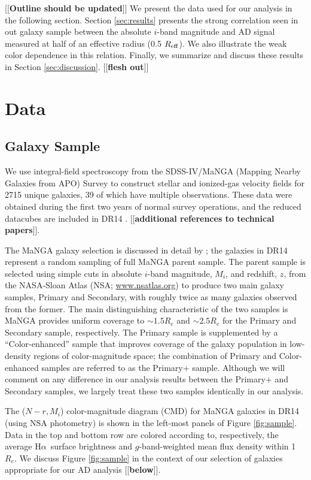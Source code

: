 \documentclass[apj,iop,revtex4,numberedappendix]{emulateapj}
\newcommand{\comment}[2][todo]{{\color{#1}[[{\bf #2}]]}}
\newcommand{\halpha}{H$\alpha$}
\begin{document}
\comment{Outline should be updated} We present the data used for our
analysis in the following section.  Section \ref{sec:results} presents
the strong correlation seen in out galaxy sample between the absolute
$i$-band magnitude and AD signal measured at half of an effective radius
(0.5 $R_{\rm eff}$).  We also illustrate the weak color dependence in
this relation.  Finally, we summarize and discuss these results in
Section \ref{sec:discussion}.  \comment{flesh out}

\section{Data}
\label{sec:data}

\subsection{Galaxy Sample}

We use integral-field spectroscopy from the SDSS-IV/MaNGA (Mapping
Nearby Galaxies from APO) Survey to construct stellar and ionized-gas
velocity fields for 2715 unique galaxies, 39 of which have multiple
observations.  These data were obtained during the first two years of
normal survey operations, and the reduced datacubes are included in DR14
\citep{2017arXiv170709322A}.  \comment{additional references to
technical papers}.

The MaNGA galaxy selection is discussed in detail by
\citet{2017AJ....154...86W}; the galaxies in DR14 represent a random
sampling of full MaNGA parent sample.  The parent sample is selected
using simple cuts in absolute $i$-band magnitude, $M_i$, and redshift,
$z$, from the NASA-Sloan Atlas (NSA; \url{www.nsatlas.org}) to produce
two main galaxy samples, Primary and Secondary, with roughly twice as
many galaxies observed from the former.  The main distinguishing
characteristic of the two samples is MaNGA provides uniform coverage to
$\sim$$1.5R_e$ and $\sim$$2.5R_e$ for the Primary and Secondary sample,
respectively.  The Primary sample is supplemented by a
``Color-enhanced'' sample that improves coverage of the galaxy
population in low-density regions of color-magnitude space; the
combination of Primary and Color-enhanced samples are referred to as the
Primary$+$ sample.  Although we will comment on any difference in our
analysis results between the Primary$+$ and Secondary samples, we
largely treat these two samples identically in our analysis.

The ($N-r, M_i$) color-magnitude diagram (CMD) for MaNGA galaxies in
DR14 (using NSA photometry) is shown in the left-most panels of Figure
\ref{fig:sample}.  Data in the top and bottom row are colored according
to, respectively, the average \halpha\ surface brightness and
$g$-band-weighted mean flux density within 1 $R_e$.  We discuss Figure
\ref{fig:sample} in the context of our selection of galaxies appropriate
for our AD analysis \comment{below}.
\end{document}
